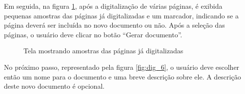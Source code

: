 Em seguida, na figura \ref{fig:dig_5}, após a digitalização de várias páginas, é exibida pequenas amostras das páginas já digitalizadas e um marcador, indicando se a página deverá ser incluída no novo documento ou não. Após a seleção das páginas, o usuário deve clicar no botão ``Gerar documento''.

\begin{figure}[h]
 \centering
    \setlength\fboxsep{0pt}
    \setlength\fboxrule{0.5pt}
  \caption {Tela mostrando amostras das páginas já digitalizadas}
  \label{fig:dig_5}
\end{figure}

No próximo passo, representado pela figura \ref{fig:dig_6}, o usuário deve escolher então um nome para o documento e uma breve descrição sobre ele. A descrição deste novo documento é opcional.

